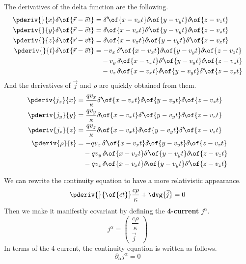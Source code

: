 The derivatives of the delta function are the following.
\begin{align*}
  \pderiv{}{x} \delta\of{\vec{r}-\vec{v}t} &= \delta'\!\of{x-v_xt}\delta\!\of{y-v_yt}\delta\!\of{z-v_zt} \\
  \pderiv{}{y} \delta\of{\vec{r}-\vec{v}t} &= \delta\!\of{x-v_xt}\delta'\!\of{y-v_yt}\delta\!\of{z-v_zt} \\
  \pderiv{}{z} \delta\of{\vec{r}-\vec{v}t} &= \delta\!\of{x-v_xt}\delta\!\of{y-v_yt}\delta'\!\of{z-v_zt} \\
  \pderiv{}{t} \delta\of{\vec{r}-\vec{v}t} &= - v_x \, \delta'\!\of{x-v_xt}\delta\!\of{y-v_yt}\delta\!\of{z-v_zt} \\
                                              &\quad - v_y \, \delta\!\of{x-v_xt}\delta'\!\of{y-v_yt}\delta\!\of{z-v_zt} \\
                                              &\quad - v_z \, \delta\!\of{x-v_xt}\delta\!\of{y-v_yt}\delta'\!\of{z-v_zt}
\end{align*}
And the derivatives of \(\vec{j}\) and \(\rho\) are quickly obtained from them.
\begin{align*}
  \pderiv{j_x}{x} &= \frac{q v_x}{\kappa} \delta'\!\of{x-v_xt}\delta\!\of{y-v_yt}\delta\!\of{z-v_zt} \\
  \pderiv{j_y}{y} &= \frac{q v_y}{\kappa} \delta\!\of{x-v_xt}\delta'\!\of{y-v_yt}\delta\!\of{z-v_zt} \\
  \pderiv{j_z}{z} &= \frac{q v_z}{\kappa} \delta\!\of{x-v_xt}\delta\!\of{y-v_yt}\delta'\!\of{z-v_zt} \\
  \pderiv{\rho}{t} &= - q v_x \, \delta'\!\of{x-v_xt}\delta\!\of{y-v_yt}\delta\!\of{z-v_zt} \\
                                              &\quad - q v_y \, \delta\!\of{x-v_xt}\delta'\!\of{y-v_yt}\delta\!\of{z-v_zt} \\
                                              &\quad - q v_z \, \delta\!\of{x-v_xt}\delta\!\of{y-v_yt}\delta'\!\of{z-v_zt}
\end{align*}



We can rewrite the continuity equation to have a more relativistic appearance.
\[\pderiv{}{\of{ct}} \frac{c\rho}{\kappa} + \dvg{\vec{j}} = 0\]
Then we make it manifestly covariant by defining the \textbf{4-current} \(j^\alpha\).
\[j^\alpha = \begin{pmatrix}\dfrac{c\rho}{\kappa} \\[1em] \vec{j}\end{pmatrix}\]
In terms of the 4-current, the continuity equation is written as follows.
\[\partial_\alpha j^\alpha = 0\]


